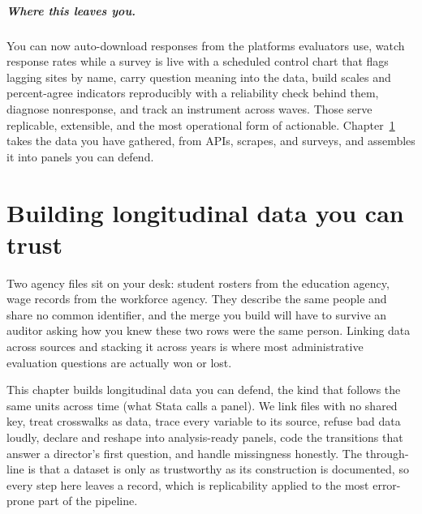 \documentclass[
    a4paper,
    fontsize=10pt,
    twoside=true,
    numbers=noenddot,
]{kaobook}
\begin{document}
\paragraph{Where this leaves you.} You can now auto-download responses from the platforms evaluators use, watch response rates while a survey is live with a scheduled control chart that flags lagging sites by name, carry question meaning into the data, build scales and percent-agree indicators reproducibly with a reliability check behind them, diagnose nonresponse, and track an instrument across waves. Those serve replicable, extensible, and the most operational form of actionable. Chapter~\ref{ch:panels} takes the data you have gathered, from APIs, scrapes, and surveys, and assembles it into panels you can defend.
\chapter{Building longitudinal data you can trust}\label{ch:panels}

Two agency files sit on your desk: student rosters from the education agency, wage records from the workforce agency. They describe the same people and share no common identifier, and the merge you build will have to survive an auditor asking how you knew these two rows were the same person. Linking data across sources and stacking it across years is where most administrative evaluation questions are actually won or lost.

This chapter builds longitudinal data you can defend, the kind that follows the same units across time (what Stata calls a panel). We link files with no shared key, treat crosswalks as data, trace every variable to its source, refuse bad data loudly, declare and reshape into analysis-ready panels, code the transitions that answer a director's first question, and handle missingness honestly. The through-line is that a dataset is only as trustworthy as its construction is documented, so every step here leaves a record, which is replicability applied to the most error-prone part of the pipeline.
\end{document}
